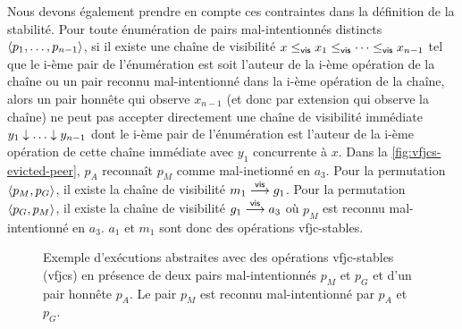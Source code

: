 Nous devons également prendre en compte ces contraintes dans la définition de la stabilité.
Pour toute énumération de pairs mal-intentionnés distincts $\tuple*{p_1, \dotsc ,p_{n-1}}$, si il existe une chaîne de visibilité $x \viseq x_1 \viseq \dotsb \viseq x_{n-1}$ tel que le i-ème pair de l'énumération est soit l'auteur de la i-ème opération de la chaîne ou un pair reconnu mal-intentionné dans la i-ème opération de la chaîne, alors un pair honnête qui observe $x_{n-1}$ (et donc par extension qui observe la chaîne) ne peut pas accepter directement une chaîne de visibilité immédiate $y_1 \idr \dotsc \idr y_{n-1}$ dont le i-ème pair de l'énumération est l'auteur de la i-ème opération de cette chaîne immédiate avec $y_1$ concurrente à $x$.
Dans la \autoref{fig:vfjcs-evicted-peer}, $p_A$ reconnaît $p_M$ comme mal-inetionné en $a_3$.
Pour la permutation $\tuple*{p_M, p_G}$, il existe la chaîne de visibilité $m_1 \vis g_1$.
Pour la permutation $\tuple*{p_G, p_M}$, il existe la chaîne de visibilité $g_1 \vis a_3$ où $p_M$ est reconnu mal-intentionné en $a_3$.
$a_1$ et $m_1$ sont donc des opérations vfjc-stables.

\begin{figure}[htb]
\centering
{}
\caption{Exemple d'exécutions abstraites avec des opérations vfjc-stables (vfjcs) en présence de deux pairs mal-intentionnés $p_M$ et $p_G$ et d'un pair honnête $p_A$.
Le pair $p_M$ est reconnu mal-intentionné par $p_A$ et $p_G$.}
\label{fig:vfjcs-evicted-peer}
\end{figure}


